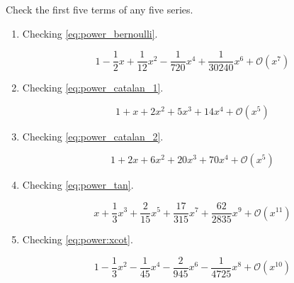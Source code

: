 \begin{exercise}
    Check the first five terms of any five series.
\end{exercise}
\begin{solution}
    \begin{enumerate}
        \item Checking \eqref{eq:power_bernoulli}.
        \begin{mapleinput}
\end{mapleinput} \begin{mapleoutput}
    \[1-\frac{1}{2} x+\frac{1}{12} x^{2}-\frac{1}{720} x^{4}+\frac{1}{30240} x^{6}+\mathcal{O} \left(x^{7}\right)\]
\end{mapleoutput}
        \item Checking \eqref{eq:power_catalan_1}. \begin{mapleinput}
\end{mapleinput} \begin{mapleoutput}
            \[1+x+2 x^{2}+5 x^{3}+14 x^{4}+\mathcal{O}\left(x^{5}\right)\]
        \end{mapleoutput}
        \item Checking \eqref{eq:power_catalan_2}.
        \begin{mapleinput}
\end{mapleinput} \begin{mapleoutput}
    \[1+2 x+6 x^{2}+20 x^{3}+70 x^{4}+\mathcal{O}\left(x^{5}\right)\]
\end{mapleoutput}
        \item Checking \eqref{eq:power_tan}.
\begin{mapleinput}
\end{mapleinput} \begin{mapleoutput}
    \[x+\frac{1}{3} x^{3}+\frac{2}{15} x^{5}+\frac{17}{315} x^{7}+\frac{62}{2835} x^{9}+\mathcal{O}\left(x^{11}\right)\]
\end{mapleoutput}
        \item Checking \eqref{eq:power:xcot}.
\begin{mapleinput}
\end{mapleinput} \begin{mapleoutput}
    \[1-\frac{1}{3} x^{2}-\frac{1}{45} x^{4}-\frac{2}{945} x^{6}-\frac{1}{4725} x^{8}+\mathcal{O}\left(x^{10}\right)\]
\end{mapleoutput}

\end{enumerate}
\end{solution}

